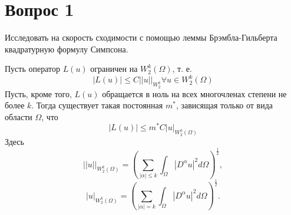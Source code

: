 \documentclass[11pt]{article}
\author{Sergey Makarov}
\date{\today}
\title{}
\newcounter{lem}\setcounter{lem}{0}
\def\lm{\par\smallskip\refstepcounter{lem}\textbf{\arabic{lem}}}
\newtheorem*{Lemma}{Лемма \lm}
\newcounter{th}\setcounter{th}{0}
\begin{document}
\section{Вопрос 1}
\label{sec:org2e45d3d}
Исследовать на скорость сходимости с помощью леммы Брэмбла-Гильберта квадратурную формулу Симпсона.

\begin{Lemma}
Пусть оператор $L(u)$ ограничен на $W_2^k(\Omega)$, т. е.
\begin{equation*}
|L(u)| \leq C||u||_{W_2^k} \forall u \in W_2^k(\Omega)
\end{equation*}
Пусть, кроме того, $L(u)$ обращается в ноль на всех многочленах степени не более $k$.
Тогда существует такая постоянная $m^*$, зависящая только от вида области $\Omega$, что
\begin{equation*}
|L(u)| \leq m^*C|u|_{W_2^k(\Omega)}
\end{equation*}
Здесь
\begin{equation*}
||u||_{W_2^k(\Omega)} = \left(\sum_{|\alpha| \leq k}\int_{\Omega}|D^{\alpha}u|^2d\Omega\right)^{\frac12},
\end{equation*}
\begin{equation*}
|u|_{W_2^k(\Omega)} = \left(\sum_{|\alpha| = k}\int_{\Omega}|D^{\alpha}u|^2d\Omega\right)^{\frac12}.
\end{equation*}
\end{Lemma}
\end{document}
